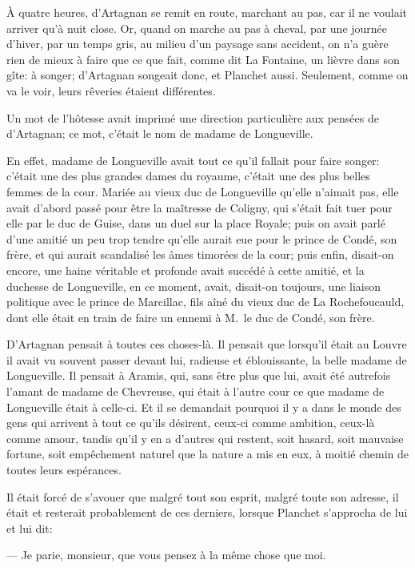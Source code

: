 À quatre heures, d'Artagnan se remit en route, marchant au pas, car il ne voulait arriver qu'à nuit close. Or, quand on marche au pas à cheval, par une journée d'hiver, par un temps gris, au milieu d'un paysage sans accident, on n'a guère rien de mieux à faire que ce que fait, comme dit La Fontaine, un lièvre dans son gîte: à songer; d'Artagnan songeait donc, et Planchet aussi. Seulement, comme on va le voir, leurs rêveries étaient différentes.

Un mot de l'hôtesse avait imprimé une direction particulière aux pensées de d'Artagnan; ce mot, c'était le nom de madame de Longueville.

En effet, madame de Longueville avait tout ce qu'il fallait pour faire songer: c'était une des plus grandes dames du royaume, c'était une des plus belles femmes de la cour. Mariée au vieux duc de Longueville qu'elle n'aimait pas, elle avait d'abord passé pour être la maîtresse de Coligny, qui s'était fait tuer pour elle par le duc de Guise, dans un duel sur la place Royale; puis on avait parlé d'une amitié un peu trop tendre qu'elle aurait eue pour le prince de Condé, son frère, et qui aurait scandalisé les âmes timorées de la cour; puis enfin, disait-on encore, une haine véritable et profonde avait succédé à cette amitié, et la duchesse de Longueville, en ce moment, avait, disait-on toujours, une liaison politique avec le prince de Marcillac, fils aîné du vieux duc de La Rochefoucauld, dont elle était en train de faire un ennemi à M.~le duc de Condé, son frère.

D'Artagnan pensait à toutes ces choses-là. Il pensait que lorsqu'il était au Louvre il avait vu souvent passer devant lui, radieuse et éblouissante, la belle madame de Longueville. Il pensait à Aramis, qui, sans être plus que lui, avait été autrefois l'amant de madame de Chevreuse, qui était à l'autre cour ce que madame de Longueville était à celle-ci. Et il se demandait pourquoi il y a dans le monde des gens qui arrivent à tout ce qu'ils désirent, ceux-ci comme ambition, ceux-là comme amour, tandis qu'il y en a d'autres qui restent, soit hasard, soit mauvaise fortune, soit empêchement naturel que la nature a mis en eux, à moitié chemin de toutes leurs espérances.

Il était forcé de s'avouer que malgré tout son esprit, malgré toute son adresse, il était et resterait probablement de ces derniers, lorsque Planchet s'approcha de lui et lui dit:

— Je parie, monsieur, que vous pensez à la même chose que moi.

